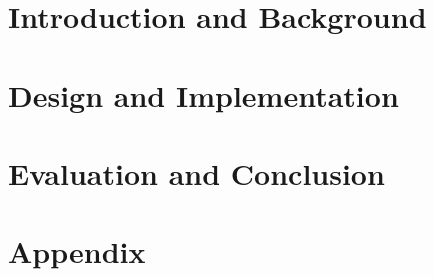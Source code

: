 \documentclass[UKenglish]{ifimaster}  %
\begin{document}
\tableofcontents

\listoftables

\listoffigures

\lstlistoflistings

\mainmatter{}

\part{Introduction and Background}




\part{Design and Implementation}



\part{Evaluation and Conclusion}





\part*{Appendix}

\appendix{}


\backmatter{}
\printbibliography
\end{document}
